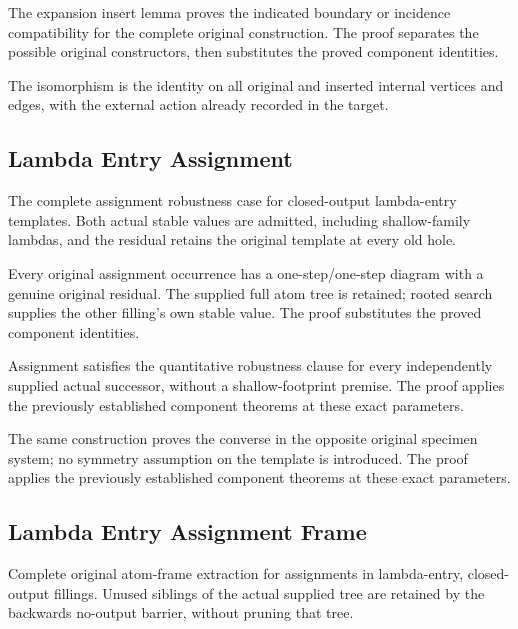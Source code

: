 The expansion insert lemma proves the indicated boundary or incidence compatibility for the complete original construction.
The proof separates the possible original constructors, then substitutes the proved component identities.
\par{}

The isomorphism is the identity on all original and inserted internal
vertices and edges, with the external action already recorded in the target.
\par{}

\subsection{Lambda Entry Assignment}
The complete assignment robustness case for closed-output lambda-entry
templates. Both actual stable values are admitted, including shallow-family
lambdas, and the residual retains the original template at every old hole.

Every original assignment occurrence has a one-step/one-step diagram
with a genuine original residual. The supplied full atom tree is retained;
rooted search supplies the other filling's own stable value.
The proof substitutes the proved component identities.
\par{}

Assignment satisfies the quantitative robustness clause for every
independently supplied actual successor, without a shallow-footprint premise.
The proof applies the previously established component theorems at these exact parameters.
\par{}

The same construction proves the converse in the opposite original
specimen system; no symmetry assumption on the template is introduced.
The proof applies the previously established component theorems at these exact parameters.
\par{}

\subsection{Lambda Entry Assignment Frame}
Complete original atom-frame extraction for assignments in lambda-entry,
closed-output fillings. Unused siblings of the actual supplied tree are
retained by the backwards no-output barrier, without pruning that tree.

